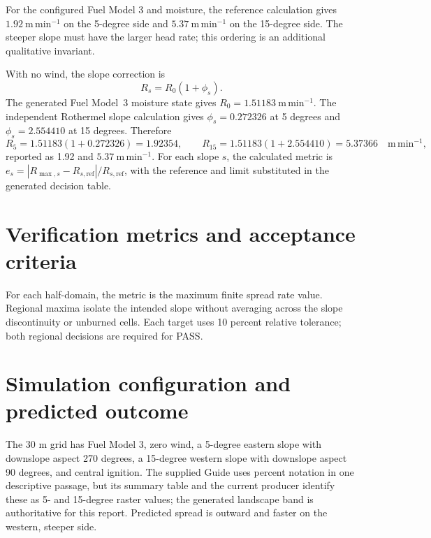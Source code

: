 For the configured Fuel Model 3 and moisture, the reference calculation gives \(1.92~\mathrm{m\,min^{-1}}\) on the 5-degree side and \(5.37~\mathrm{m\,min^{-1}}\) on the 15-degree side.  The steeper slope must have the larger head rate; this ordering is an additional qualitative invariant.

With no wind, the slope correction is
\[
 R_s=R_0(1+\phi_s).
\]
The generated Fuel Model~3 moisture state gives
\(R_0=1.51183~\mathrm{m\,min^{-1}}\).  The independent Rothermel slope
calculation gives \(\phi_s=0.272326\) at 5 degrees and
\(\phi_s=2.554410\) at 15 degrees.  Therefore
\[
 R_{5}=1.51183(1+0.272326)=1.92354,\qquad
 R_{15}=1.51183(1+2.554410)=5.37366
 \quad\mathrm{m\,min^{-1}},
\]
reported as 1.92 and \(5.37~\mathrm{m\,min^{-1}}\).  For each slope
\(s\), the calculated metric is
\(e_s=|R_{\max,s}-R_{s,\mathrm{ref}}|/R_{s,\mathrm{ref}}\), with the
reference and limit substituted in the generated decision table.

\section{Verification metrics and acceptance criteria}

For each half-domain, the metric is the maximum finite spread rate value. Regional maxima isolate the intended slope without averaging across the slope discontinuity or unburned cells. Each target uses 10 percent relative tolerance; both regional decisions are required for PASS.

\section{Simulation configuration and predicted outcome}

The 30 m grid has Fuel Model 3, zero wind, a 5-degree eastern slope with downslope aspect 270 degrees, a 15-degree western slope with downslope aspect 90 degrees, and central ignition. The supplied Guide uses percent notation in one descriptive passage, but its summary table and the current producer identify these as 5- and 15-degree raster values; the generated landscape band is authoritative for this report. Predicted spread is outward and faster on the western, steeper side.

